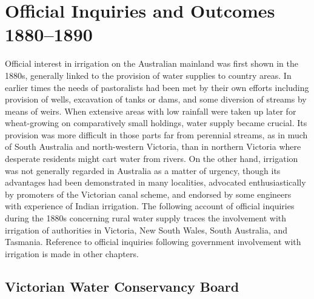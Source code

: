 
\setcounter{endnote}{0}

\chapter{Official Inquiries and Outcomes 1880--1890}
\label{ch:inquiries}

Official interest in irrigation on the Australian mainland was first
shown in the 1880s, generally linked to the provision of water
supplies to country areas.  In earlier times the needs of pastoralists
had been met by their own efforts including provision of wells,
excavation of tanks or dams, and some diversion of streams by means of
weirs.  When extensive areas with low rainfall were taken up later for
wheat-growing on comparatively small holdings, water supply became
crucial.  Its provision was more difficult in those parts far from
perennial streams, as in much of South Australia and north-western
Victoria, than in northern Victoria where desperate residents might
cart water from rivers.  On the other hand, irrigation was not
generally regarded in Australia as a matter of urgency, though its
advantages had been demonstrated in many localities, advocated
enthusiastically by promoters of the Victorian canal scheme, and
endorsed by some engineers with experience of Indian irrigation.  The
following account of official inquiries during the 1880s concerning
rural water supply traces the involvement with irrigation of
authorities in Victoria, New South Wales, South Australia, and
Tasmania.  Reference to official inquiries following government
involvement with irrigation is made in other chapters.

\section*{Victorian Water Conservancy Board}


